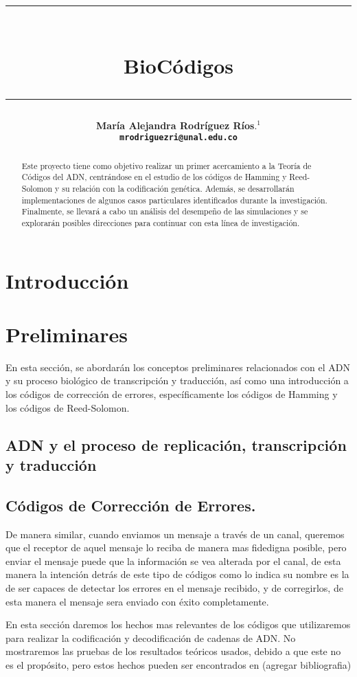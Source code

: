 \documentclass[12pt]{article}
\title{\vspace{-2cm}\par\noindent\rule{16cm}{1pt}\large
\\\bfseries BioCódigos
\vspace{-0.34cm}\par\noindent\hspace{0.15cm}\rule{16cm}{1pt}
\vspace{-0.6cm}
}
\author{\small \bfseries María Alejandra Rodríguez Ríos$.^1$
\\ \small \quad \texttt{mrodriguezri@unal.edu.co} %
}
\begin{document}
\maketitle
\begin{abstract}
Este proyecto tiene como objetivo realizar un primer acercamiento a la Teoría de Códigos del ADN, centrándose en el estudio de los códigos de Hamming y Reed-Solomon y su relación con la codificación genética. Además, se desarrollarán implementaciones de algunos casos particulares identificados durante la investigación. Finalmente, se llevará a cabo un análisis del desempeño de las simulaciones y se explorarán posibles direcciones para continuar con esta línea de investigación.
\end{abstract}

\section{Introducción}





\section{Preliminares}
En esta sección, se abordarán los conceptos preliminares relacionados con el ADN y su proceso biológico de transcripción y traducción, así como una introducción a los códigos de corrección de errores, específicamente los códigos de Hamming y los códigos de Reed-Solomon.
\subsection{ADN y el proceso de replicación, transcripción y traducción}

\subsection{Códigos de Corrección de Errores.}
De manera similar, cuando enviamos un mensaje a través de un canal, queremos que el receptor de aquel mensaje lo reciba de manera mas fidedigna posible, pero enviar el mensaje puede que la información se vea alterada por el canal, de esta manera la intención detrás de este tipo de códigos como lo indica su nombre es la de ser capaces de detectar los errores en el mensaje recibido, y de corregirlos, de esta manera el mensaje sera enviado con éxito completamente.

En esta sección daremos los hechos mas relevantes de los códigos que utilizaremos para realizar la codificación y decodificación de cadenas de ADN. No mostraremos las pruebas de los resultados teóricos usados, debido a que este no es el propósito, pero estos hechos pueden ser encontrados en (agregar bibliografia)


\end{document}
